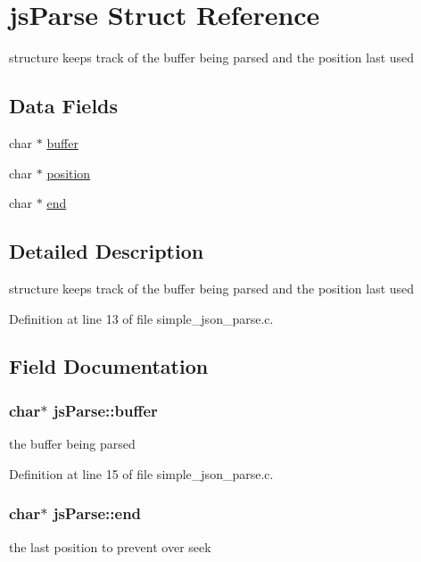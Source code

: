 \hypertarget{structjsParse}{}\section{js\+Parse Struct Reference}
\label{structjsParse}


structure keeps track of the buffer being parsed and the position last used  


\subsection*{Data Fields}
\begin{DoxyCompactItemize}
\item 
char $\ast$ \hyperlink{structjsParse_a9c0b007595634aae8cdb98a7a85b846a}{buffer}
\item 
char $\ast$ \hyperlink{structjsParse_ace05b203435af05113a9a4b7c40f0324}{position}
\item 
char $\ast$ \hyperlink{structjsParse_aa9b5c5a2d56b1753ccadf84c00385fba}{end}
\end{DoxyCompactItemize}


\subsection{Detailed Description}
structure keeps track of the buffer being parsed and the position last used 

Definition at line 13 of file simple\+\_\+json\+\_\+parse.\+c.



\subsection{Field Documentation}
\subsubsection[{\texorpdfstring{buffer}{buffer}}]{\setlength{\rightskip}{0pt plus 5cm}char$\ast$ js\+Parse\+::buffer}\hypertarget{structjsParse_a9c0b007595634aae8cdb98a7a85b846a}{}\label{structjsParse_a9c0b007595634aae8cdb98a7a85b846a}
the buffer being parsed 

Definition at line 15 of file simple\+\_\+json\+\_\+parse.\+c.

\subsubsection[{\texorpdfstring{end}{end}}]{\setlength{\rightskip}{0pt plus 5cm}char$\ast$ js\+Parse\+::end}\hypertarget{structjsParse_aa9b5c5a2d56b1753ccadf84c00385fba}{}\label{structjsParse_aa9b5c5a2d56b1753ccadf84c00385fba}
the last position to prevent over seek 

